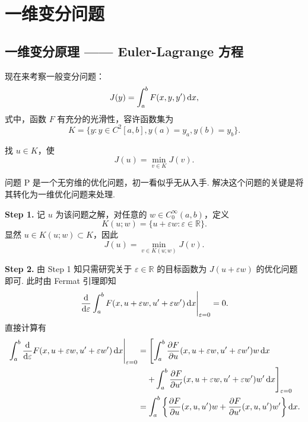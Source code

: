 \section{一维变分问题}

\subsection{一维变分原理 —— Euler-Lagrange 方程}

现在来考察一般变分问题：
\begin{equation*}
    J(y) = \int_a^b F(x, y, y')\mathop{}\!\mathrm{d} x,
\end{equation*}
式中，函数 $F$ 有充分的光滑性，容许函数集为
\begin{equation*}
    K = \{y : y \in C^2[a, b], y(a) = y_a, y(b) = y_b \}.
\end{equation*}

\begin{question}[问题 P]
找 $u \in K$，使
\begin{equation*}
    J(u) = \min_{v \in K} J(v).
\end{equation*}
\end{question}

问题 P 是一个无穷维的优化问题，初一看似乎无从入手. 解决这个问题的关键是将其转化为一维优化问题来处理.

\noindent\textbf{Step 1.} 记 $u$ 为该问题之解，对任意的 $w \in C_0^\infty(a, b)$，定义
\begin{equation*}
    K(u; w) = \{ u + \varepsilon w : \varepsilon \in \mathbb{R} \}.
\end{equation*}
显然 $u \in K(u; w) \subset K$，因此
\begin{equation*}
    J(u) = \min_{v \in K(u; w)} J(v).
\end{equation*}

\noindent\textbf{Step 2.} 由 Step 1 知只需研究关于 $\varepsilon \in \mathbb{R}$ 的目标函数为 $J(u + \varepsilon w)$ 的优化问题即可. 此时由 Fermat 引理即知
\begin{equation*}
    \left. \frac{\mathop{}\!\mathrm{d} }{\mathop{}\!\mathrm{d} \varepsilon} \int_a^b F(x, u+\varepsilon w, u'+\varepsilon w')\mathop{}\!\mathrm{d} x \right|_{\varepsilon=0} = 0.
\end{equation*}
直接计算有
\begin{align*}
    \left. \int_a^b \frac{\mathop{}\!\mathrm{d} }{\mathop{}\!\mathrm{d} \varepsilon} F(x, u+\varepsilon w, u'+\varepsilon w')\mathop{}\!\mathrm{d} x \right|_{\varepsilon=0} &= \left[ \int_a^b \frac{\partial F}{\partial u} (x, u+\varepsilon w, u'+\varepsilon w') w \mathop{}\!\mathrm{d} x \right. \\
    &\left. \quad + \int_a^b \frac{\partial F}{\partial u'} (x, u+\varepsilon w, u'+\varepsilon w') w' \mathop{}\!\mathrm{d} x \right]_{\varepsilon = 0} \\
    &= \int_a^b \left\{ \frac{\partial F}{\partial u} (x, u, u') w + \frac{\partial F}{\partial u'} (x, u, u') w' \right\} \mathop{}\!\mathrm{d} x.
\end{align*}


